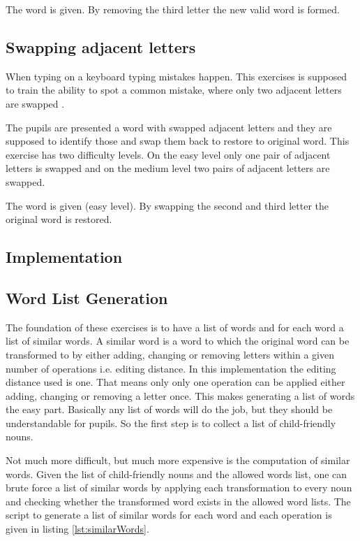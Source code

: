 \begin{example}
    The word  is given. By removing the third letter the new valid word  is formed.
\end{example}

\subsection*{Swapping adjacent letters}
\label{subsection:swappingLetters}

When typing on a keyboard typing mistakes happen. This exercises is supposed to train the ability to spot a common mistake, where only two adjacent letters are swapped \cite{EinfachInformatik}.

The pupils are presented a word with swapped adjacent letters and they are supposed to identify those and swap them back to restore to original word. This exercise has two difficulty levels. On the easy level only one pair of adjacent letters is swapped and on the medium level two pairs of adjacent letters are swapped.

\begin{example}
    The word  is given (easy level). By swapping the second and third letter the original word  is restored.
\end{example}

\subsection{Implementation}

\subsection*{Word List Generation}

The foundation of these exercises is to have a list of words and for each word a list of similar words. A similar word is a word to which the original word can be transformed to by either adding, changing or removing letters within a given number of operations i.e. editing distance. In this implementation the editing distance used is one. That means only only one operation can be applied either adding, changing or removing a letter once. This makes generating a list of words the easy part. Basically any list of words will do the job, but they should be understandable for pupils. So the first step is to collect a list of child-friendly nouns. 

Not much more difficult, but much more expensive is the computation of similar words. Given the list of child-friendly nouns and the allowed words list, one can brute force a list of similar words by applying each transformation to every noun and checking whether the transformed word exists in the allowed word lists. The script to generate a list of similar words for each word and each operation is given in listing \ref{lst:similarWords}.

